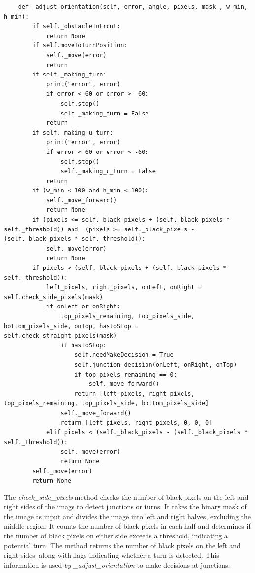 \documentclass[a4paper,12pt]{extreport}
\begin{document}
\begin{verbatim}
    def _adjust_orientation(self, error, angle, pixels, mask , w_min, h_min):
        if self._obstacleInFront:
            return None
        if self.moveToTurnPosition:
            self._move(error)
            return
        if self._making_turn:
            print("error", error)
            if error < 60 or error > -60:
                self.stop()
                self._making_turn = False
            return
        if self._making_u_turn:
            print("error", error)
            if error < 60 or error > -60:
                self.stop()
                self._making_u_turn = False
            return
        if (w_min < 100 and h_min < 100):
            self._move_forward()
            return None
        if (pixels <= self._black_pixels + (self._black_pixels * self._threshold)) and  (pixels >= self._black_pixels - (self._black_pixels * self._threshold)):
            self._move(error)
            return None
        if pixels > (self._black_pixels + (self._black_pixels * self._threshold)):
            left_pixels, right_pixels, onLeft, onRight = self.check_side_pixels(mask)
            if onLeft or onRight:
                top_pixels_remaining, top_pixels_side, bottom_pixels_side, onTop, hastoStop = self.check_straight_pixels(mask)
                if hastoStop:
                    self.needMakeDecision = True
                    self.junction_decision(onLeft, onRight, onTop)
                    if top_pixels_remaining == 0:
                        self._move_forward()
                    return [left_pixels, right_pixels, top_pixels_remaining, top_pixels_side, bottom_pixels_side]
                self._move_forward()
                return [left_pixels, right_pixels, 0, 0, 0]
            elif pixels < (self._black_pixels - (self._black_pixels * self._threshold)):
                self._move(error)
                return None
        self._move(error)
        return None
\end{verbatim}
\label{judeFig28}

The \emph{check\_side\_pixels} method checks the number of black pixels
on the left and right sides of the image to detect junctions or turns.
It takes the binary mask of the image as input and divides the image
into left and right halves, excluding the middle region. It counts the
number of black pixels in each half and determines if the number of
black pixels on either side exceeds a threshold, indicating a potential
turn. The method returns the number of black pixels on the left and
right sides, along with flags indicating whether a turn is detected.
This information is used \emph{by \_adjust\_orientation} to make
decisions at junctions.
\end{document}
